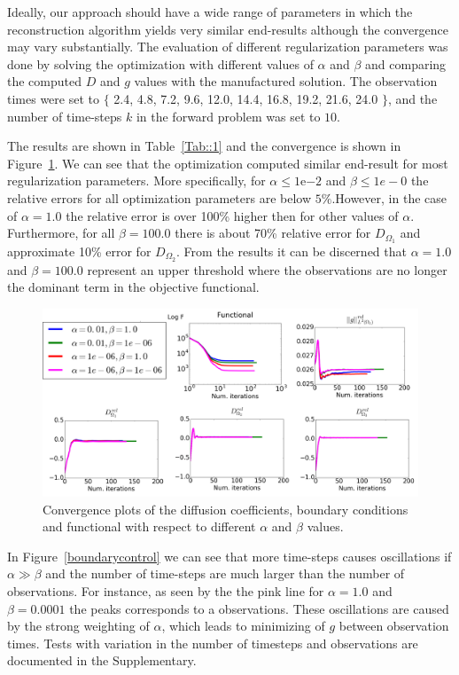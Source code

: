 \documentclass[12pt,a4paper]{article}
\begin{document}
Ideally, our approach should have a wide range of parameters in which the reconstruction algorithm yields very similar end-results although the convergence may vary substantially. The evaluation of different regularization parameters was done by solving the optimization with different values of $\alpha$ and $\beta$ and comparing the computed $D$ and $g$ values with the manufactured solution. The observation times were set to $\lbrace$ 2.4, 4.8, 7.2, 9.6, 12.0, 14.4, 16.8, 19.2, 21.6, 24.0 $\rbrace$, and the number of time-steps $k$ in the forward problem was set to $10$. 

The results are shown in Table~\ref{Tab::1} and the convergence is shown in Figure~\ref{convergence}. We can see that the optimization computed similar end-result for most regularization parameters. More specifically, for $\alpha \leq 1\mathrm{e}{-2}$ and $\beta \leq 1e-0$ the relative errors for all optimization parameters are below $5\%$.However, in the case of $ \alpha=1.0$ the relative error is over 100\% higher then for other values of $\alpha$. Furthermore, for all $\beta=100.0$ there is about 70\% relative error for $D_{\Omega_1}$ and approximate 10\% error for $D_{\Omega_2}$. From the results it can be discerned that $\alpha =1.0$ and $\beta=100.0$ represent an upper threshold where the observations are no longer the dominant term in the objective functional.  


\begin{figure}
\centering
\includegraphics[scale=0.18]{Convergence-plot.png}   
\caption{Convergence plots of the diffusion coefficients, boundary conditions and functional with respect to different $\alpha$ and $\beta$ values. } 
\label{convergence}
\end{figure}

In Figure~\ref{boundarycontrol} we can see that more time-steps causes oscillations if $\alpha\gg\beta$ and the number of time-steps are much larger than the number of observations. For instance, as seen by the the pink line for $\alpha=1.0$ and $\beta=0.0001$ the peaks corresponds to a observations. These oscillations are caused by the strong weighting of $\alpha$, which leads to minimizing of $g$ between observation times. 
Tests with variation in the number of timesteps and observations are documented in the Supplementary. 
\end{document}
